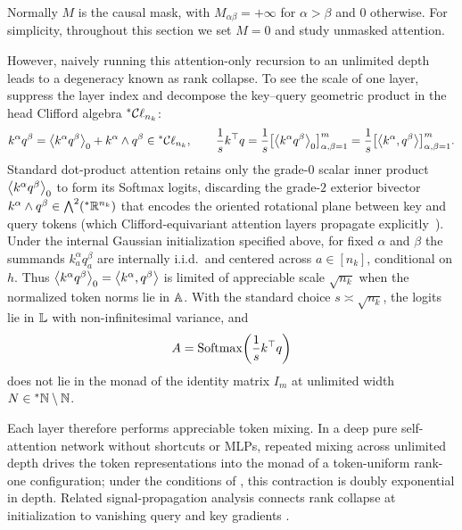 Normally $M$ is the causal mask, with $M_{\alpha\beta} = +\infty$ for $\alpha > \beta$ and $0$ otherwise. For simplicity, throughout this section we set $M = 0$ and study unmasked attention.

However, naively running this attention-only recursion to an unlimited depth leads to a degeneracy known as rank collapse. To see the scale of one layer, suppress the layer index and decompose the key--query geometric product in the head Clifford algebra ${}^*\mathcal{C}\ell_{n_k}$:
\begin{equation}
\label{eq:ch6-logit-ip}
k^\alpha q^\beta = \left\langle k^\alpha q^\beta \right\rangle_0 + k^\alpha \wedge q^\beta \in {}^*\mathcal{C}\ell_{n_k}, \qquad
\frac{1}{s} k^\top q = \frac{1}{s} \bigl[\left\langle k^\alpha q^\beta \right\rangle_0\bigr]_{\alpha,\beta=1}^m = \frac{1}{s} \bigl[\left\langle k^\alpha, q^\beta \right\rangle\bigr]_{\alpha,\beta=1}^m.
\end{equation}
Standard dot-product attention retains only the grade-$0$ scalar inner product $\left\langle k^\alpha q^\beta \right\rangle_0$ to form its Softmax logits, discarding the grade-$2$ exterior bivector $k^\alpha \wedge q^\beta \in \bigwedge^2({}^*\mathbb{R}^{n_k})$ that encodes the oriented rotational plane between key and query tokens (which Clifford-equivariant attention layers propagate explicitly~\cite{ruhe2023clifford,brandstetter2023clifford}). Under the internal Gaussian initialization specified above, for fixed $\alpha$ and $\beta$ the summands $k_a^\alpha q_a^\beta$ are internally i.i.d.\ and centered across $a \in [n_k]$, conditional on $h$. Thus $\left\langle k^\alpha q^\beta \right\rangle_0 = \left\langle k^\alpha, q^\beta \right\rangle$ is limited of appreciable scale $\sqrt{n_k}$ when the normalized token norms lie in $\mathbb{A}$. With the standard choice $s \asymp \sqrt{n_k}$, the logits lie in $\mathbb{L}$ with non-infinitesimal variance, and
\begin{equation}
\label{eq:ch6-unshaped-softmax}
A = \operatorname{Softmax}\!\left(\frac{1}{s} k^\top q\right)
\end{equation}
does not lie in the monad of the identity matrix $I_m$ at unlimited width $N \in {}^*\mathbb{N} \setminus \mathbb{N}$.

Each layer therefore performs appreciable token mixing. In a deep pure self-attention network without shortcuts or MLPs, repeated mixing across unlimited depth drives the token representations into the monad of a token-uniform rank-one configuration; under the conditions of \cite[Theorem 2.3]{dong2021attention}, this contraction is doubly exponential in depth. Related signal-propagation analysis connects rank collapse at initialization to vanishing query and key gradients \cite[Theorem 3.2]{noci2022signal}.

